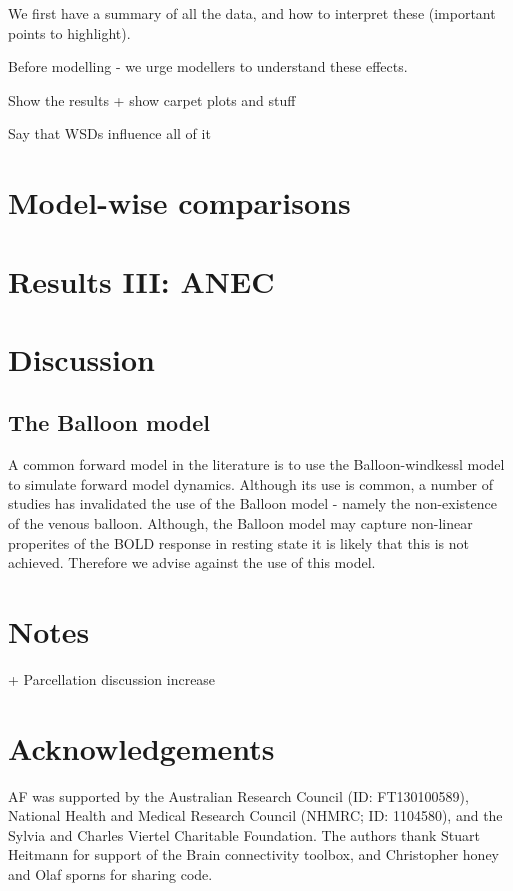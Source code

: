 \documentclass[oneside]{zHenriquesLab-StyleBioRxiv}
\begin{document}
We first have a summary of all the data, and how to interpret these (important points to highlight).

Before modelling - we urge modellers to understand these effects. 

Show the results + show carpet plots and stuff

Say that WSDs influence all of it

\section*{Model-wise comparisons}

\section*{Results III: ANEC}

\section*{Discussion}

\subsection*{The Balloon model} 

A common forward model in the literature is to use the Balloon-windkessl model to simulate forward model dynamics. Although its use is common, a number of studies has invalidated the use of the Balloon model - namely the non-existence of the venous balloon. Although, the Balloon model may capture non-linear properites of the BOLD response in resting state it is likely that this is not achieved. Therefore we advise against the use of this model. 

\section*{Notes}
+ Parcellation discussion increase

\section*{Acknowledgements}


\begin{acknowledgements}
AF was supported by the Australian Research Council (ID: FT130100589), National Health and Medical Research Council (NHMRC; ID: 1104580), and the Sylvia and Charles Viertel Charitable Foundation. The authors thank Stuart Heitmann for support of the Brain connectivity toolbox, and Christopher honey and Olaf sporns for sharing code. 
\end{acknowledgements}
\end{document}
